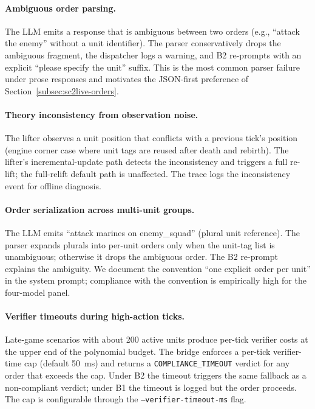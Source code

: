 \documentclass{article}
\theoremstyle{definition}
\begin{document}
\paragraph{Ambiguous order parsing.} The LLM emits a response that is ambiguous between two orders (e.g., ``attack the enemy'' without a unit identifier). The parser conservatively drops the ambiguous fragment, the dispatcher logs a warning, and B2 re-prompts with an explicit ``please specify the unit'' suffix. This is the most common parser failure under prose responses and motivates the JSON-first preference of Section~\ref{subsec:sc2live-orders}.

\paragraph{Theory inconsistency from observation noise.} The lifter observes a unit position that conflicts with a previous tick's position (engine corner case where unit tags are reused after death and rebirth). The lifter's incremental-update path detects the inconsistency and triggers a full re-lift; the full-relift default path is unaffected. The trace logs the inconsistency event for offline diagnosis.

\paragraph{Order serialization across multi-unit groups.} The LLM emits ``attack marines on enemy\_squad'' (plural unit reference). The parser expands plurals into per-unit orders only when the unit-tag list is unambiguous; otherwise it drops the ambiguous order. The B2 re-prompt explains the ambiguity. We document the convention ``one explicit order per unit'' in the system prompt; compliance with the convention is empirically high for the four-model panel.

\paragraph{Verifier timeouts during high-action ticks.} Late-game scenarios with about 200 active units produce per-tick verifier costs at the upper end of the polynomial budget. The bridge enforces a per-tick verifier-time cap (default 50~ms) and returns a \texttt{COMPLIANCE\_TIMEOUT} verdict for any order that exceeds the cap. Under B2 the timeout triggers the same fallback as a non-compliant verdict; under B1 the timeout is logged but the order proceeds. The cap is configurable through the \texttt{--verifier-timeout-ms} flag.
\end{document}
